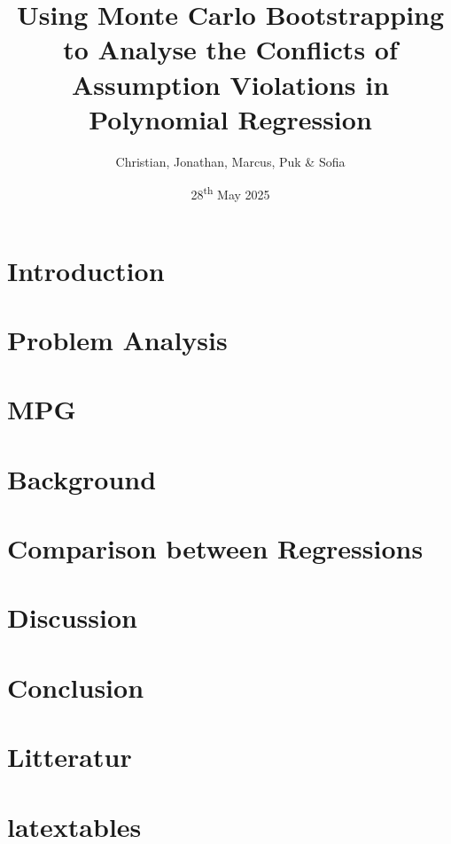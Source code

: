 \documentclass{article}
\title{Using Monte Carlo Bootstrapping to Analyse the Conflicts of Assumption Violations in Polynomial Regression\\}
\author{Christian, Jonathan, Marcus, Puk \& Sofia }
\date{28\textsuperscript{th} May 2025}
\begin{document}
	\setcounter{section}{0}
	
	
	\newpage
	\tableofcontents
	\newpage
	
	\section{Introduction}
	
	\newpage
	
	\section{Problem Analysis}
	
	\newpage
	
	\section{MPG}
	
	\newpage
	\section{Background}
	
	\newpage
 	
	\newpage
	
	\newpage
	
	\newpage
	
	\newpage
	
	\newpage
%	
	
	
%	
	
	
%	
	
	
	\section{Comparison between Regressions}
	
	\newpage
	
	\section{Discussion}
	
	\newpage
	
	\section{Conclusion}
	
	\newpage
	
 	\section{Litteratur}
 	
 	\section{latextables}
 	\newpage
 	
 	
 	
 	
\end{document}
